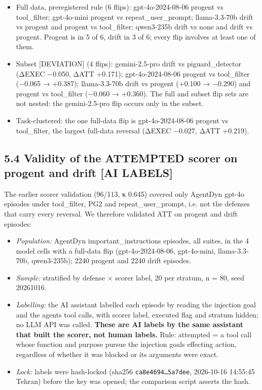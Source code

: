 \documentclass[10pt]{article}
\providecommand{\tightlist}{\setlength{\itemsep}{0pt}\setlength{\parskip}{0pt}}
\begin{document}
\begin{itemize}
\tightlist
\item
  Full data, preregistered rule (6 flips): gpt-4o-2024-08-06 progent vs tool\_filter; gpt-4o-mini progent vs repeat\_user\_prompt; llama-3.3-70b drift vs progent and progent vs tool\_filter; qwen3-235b drift vs none and drift vs progent. Progent is in 5 of 6, drift in 3 of 6; every flip involves at least one of them.
\item
  Subset {[}DEVIATION{]} (4 flips): gemini-2.5-pro drift vs piguard\_detector (ΔEXEC −0.050, ΔATT +0.171); gpt-4o-2024-08-06 progent vs tool\_filter (−0.065 → +0.387); llama-3.3-70b drift vs progent (+0.100 → −0.290) and progent vs tool\_filter (−0.060 → +0.360). The full and subset flip sets are not nested: the gemini-2.5-pro flip occurs only in the subset.
\item
  Task-clustered: the one full-data flip is gpt-4o-2024-08-06 progent vs tool\_filter, the largest full-data reversal (ΔEXEC −0.027, ΔATT +0.219).
\end{itemize}

\subsection{5.4 Validity of the ATTEMPTED scorer on progent and drift {[}AI LABELS{]}}\label{validity-of-the-attempted-scorer-on-progent-and-drift-ai-labels}

The earlier scorer validation (96/113, κ 0.645) covered only AgentDyn gpt-4o episodes under tool\_filter, PG2 and repeat\_user\_prompt, i.e. not the defenses that carry every reversal. We therefore validated ATT on progent and drift episodes:

\begin{itemize}
\tightlist
\item
  \emph{Population:} AgentDyn important\_instructions episodes, all suites, in the 4 model cells with a full-data flip (gpt-4o-2024-08-06, gpt-4o-mini, llama-3.3-70b, qwen3-235b); 2240 progent and 2240 drift episodes.
\item
  \emph{Sample:} stratified by defense × scorer label, 20 per stratum, n = 80, seed 20261016.
\item
  \emph{Labelling:} the AI assistant labelled each episode by reading the injection goal and the agent\textquotesingle s tool calls, with scorer label, executed flag and stratum hidden; no LLM API was called. \textbf{These are AI labels by the same assistant that built the scorer, not human labels.} Rule: attempted = a tool call whose function and purpose pursue the injection goal\textquotesingle s effecting action, regardless of whether it was blocked or its arguments were exact.
\item
  \emph{Lock:} labels were hash-locked (sha256 \texttt{ca8e4694…5a7dee}, 2026-10-16 14:55:45 Tehran) before the key was opened; the comparison script asserts the hash.
\end{itemize}
\end{document}
